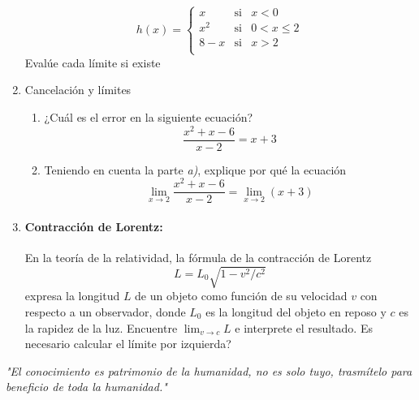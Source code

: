 \documentclass[10pt,twoside]{article}
\begin{document}
\begin{enumerate}
\[h(x)=\left\{ \begin{array}{lcl}
x & \mbox{si} & x<0\\
x^{2}  & \mbox{si} & 0<x\leq 2\\
8-x & \mbox{si} & x>2\\
\end{array}
\right.\]
Evalúe cada límite si existe
\begin{enumerate}
\end{enumerate}
\item Cancelación y límites
\begin{enumerate}
\item ¿Cuál es el error en la siguiente ecuación?
\[\dfrac{x^{2}+x-6}{x-2}=x+3\]
\item Teniendo en cuenta la parte \emph{a)}, explique por qué la ecuación
\[\displaystyle{\lim_{x\rightarrow 2}}\dfrac{x^{2}+x-6}{x-2}=\displaystyle{\lim_{x\rightarrow 2}}(x+3)\]
\end{enumerate}
\item \paragraph*{Contracción de Lorentz:} En la teoría de la relatividad, la fórmula de la contracción de Lorentz
\[L=L_{0}\sqrt{1-v^{2}/c^{2}}\]
expresa la longitud $L$ de un objeto como función de su velocidad $v$ con respecto a un observador, donde $L_{0}$ es la longitud del objeto en reposo y $c$ es la rapidez de la luz. Encuentre \hspace*{.5cm} $\displaystyle{\lim_{v\rightarrow c}}L$  \hspace*{.5cm} e interprete el resultado. Es necesario calcular el límite por izquierda?
\end{enumerate}
\vspace*{20pt}

\emph{"El conocimiento es patrimonio de la humanidad, no es solo tuyo, trasmítelo para beneficio de toda la humanidad."}
\end{document}
